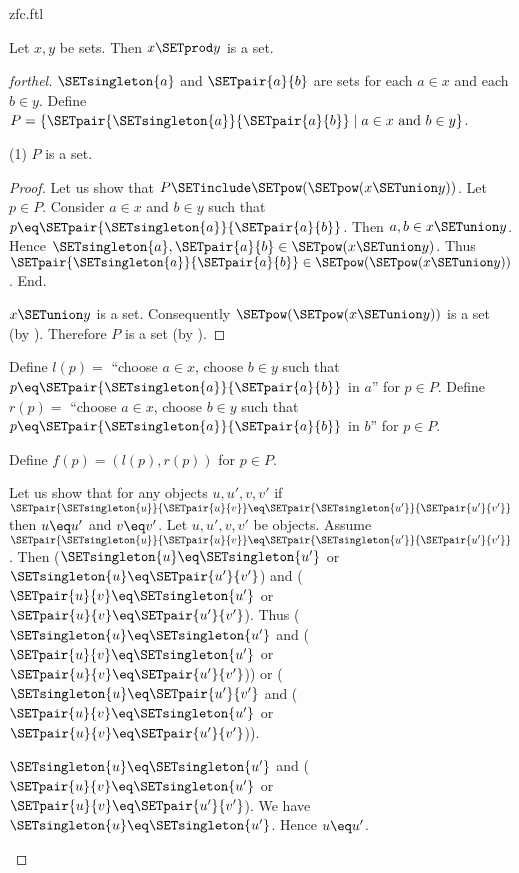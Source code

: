 \documentclass{naproche-library}
\begin{document}
\begin{smodule}[title=ZFC]{zfc.ftl}
\begin{proposition}[forthel,id=FOUNDATIONS_10_4458706448154624]
  Let $x, y$ be sets.
  Then $x \SETprod y$ is a set.
\end{proposition}
\begin{proof}[forthel]
  $\SETsingleton{a}$ and $\SETpair{a}{b}$ are sets for each $a \in x$ and each $b \in y$.
  Define $P = \{ \SETpair{\SETsingleton{a}}{\SETpair{a}{b}} \mid a \in x\text{ and }b \in y \}$.

  (1) $P$ is a set.
  \begin{proof}
    Let us show that $P \SETinclude \SETpow(\SETpow(x \SETunion y))$.
      Let $p \in P$.
      Consider $a \in x$ and $b \in y$ such that $p \eq \SETpair{\SETsingleton{a}}{\SETpair{a}{b}}$.
      Then $a, b \in x \SETunion y$.
      Hence $\SETsingleton{a}, \SETpair{a}{b} \in \SETpow(x \SETunion y)$.
      Thus $\SETpair{\SETsingleton{a}}{\SETpair{a}{b}} \in \SETpow(\SETpow(x \SETunion y))$.
    End.

    $x \SETunion y$ is a set.
    Consequently $\SETpow(\SETpow(x \SETunion y))$ is a set (by ).
    Therefore $P$ is a set (by ).
  \end{proof}

  Define $l(p) =$ ``choose $a \in x$, choose $b \in y$ such that $p \eq \SETpair{\SETsingleton{a}}{\SETpair{a}{b}}$ in $a$'' for $p \in P$.
  Define $r(p) =$ ``choose $a \in x$, choose $b \in y$ such that $p \eq \SETpair{\SETsingleton{a}}{\SETpair{a}{b}}$ in $b$'' for $p \in P$.

  Define $f(p) = (l(p), r(p))$ for $p \in P$.

  Let us show that for any objects $u, u', v, v'$ if
  $\SETpair{\SETsingleton{u}}{\SETpair{u}{v}} \eq \SETpair{\SETsingleton{u'}}{\SETpair{u'}{v'}}$ then $u \eq u'$ and $v \eq v'$.
    Let $u, u', v, v'$ be objects.
    Assume $\SETpair{\SETsingleton{u}}{\SETpair{u}{v}} \eq \SETpair{\SETsingleton{u'}}{\SETpair{u'}{v'}}$.
    Then ($\SETsingleton{u} \eq \SETsingleton{u'}$ or $\SETsingleton{u} \eq \SETpair{u'}{v'}$) and ($\SETpair{u}{v} \eq \SETsingleton{u'}$ or $\SETpair{u}{v} \eq \SETpair{u'}{v'}$).
    Thus ($\SETsingleton{u} \eq \SETsingleton{u'}$ and ($\SETpair{u}{v} \eq \SETsingleton{u'}$ or $\SETpair{u}{v} \eq \SETpair{u'}{v'}$)) or ($\SETsingleton{u} \eq \SETpair{u'}{v'}$ and ($\SETpair{u}{v} \eq \SETsingleton{u'}$ or $\SETpair{u}{v} \eq \SETpair{u'}{v'}$)).

    \begin{case}{$\SETsingleton{u} \eq \SETsingleton{u'}$ and ($\SETpair{u}{v} \eq \SETsingleton{u'}$ or $\SETpair{u}{v} \eq \SETpair{u'}{v'}$).}
      We have $\SETsingleton{u} \eq \SETsingleton{u'}$.
      Hence $u \eq u'$.


\end{case}
\end{proof}
\end{smodule}
\end{document}
